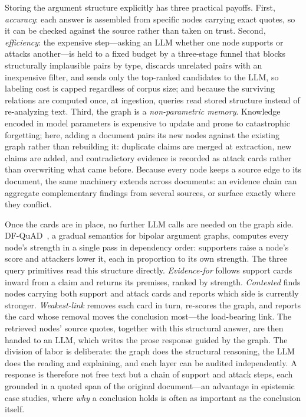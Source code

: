 \documentclass{article}
\begin{document}
Storing the argument structure explicitly has three practical payoffs. First,
\emph{accuracy}: each answer is assembled from specific nodes carrying exact
quotes, so it can be checked against the source rather than taken on trust.
Second, \emph{efficiency}: the expensive step---asking an LLM whether one node
supports or attacks another---is held to a fixed budget by a three-stage funnel
that blocks structurally implausible pairs by type, discards unrelated pairs
with an inexpensive filter, and sends only the top-ranked candidates to the
LLM, so labeling cost is capped regardless of corpus size; and because the
surviving relations are computed once, at ingestion, queries read stored
structure instead of re-analyzing text. Third, the graph is a
\emph{non-parametric memory}. Knowledge encoded in model parameters is
expensive to update and prone to catastrophic forgetting; here, adding a
document pairs its new nodes against the existing graph rather than rebuilding
it: duplicate claims are merged at extraction, new claims are added, and
contradictory evidence is recorded as attack cards rather than overwriting
what came before. Because every node keeps a source edge to its document, the
same machinery extends across documents: an evidence chain can aggregate
complementary findings from several sources, or surface exactly where they
conflict.

Once the cards are in place, no further LLM calls are needed on the graph side.
DF-QuAD~\cite{rago2016dfquad}, a gradual semantics for bipolar argument graphs, computes every
node's strength in a single pass in dependency order: supporters raise a
node's score and attackers lower it, each in proportion to its own strength.
The three query primitives read this structure directly. \emph{Evidence-for}
follows support cards inward from a claim and returns its premises, ranked by
strength. \emph{Contested} finds nodes carrying both support and attack cards
and reports which side is currently stronger. \emph{Weakest-link} removes each
card in turn, re-scores the graph, and reports the card whose removal moves
the conclusion most---the load-bearing link. The retrieved nodes' source
quotes, together with this structural answer, are then handed to an LLM, which
writes the prose response guided by the graph. The division of labor is
deliberate: the graph does the structural reasoning, the LLM does the reading
and explaining, and each layer can be audited independently. A response is
therefore not free text but a chain of support and attack steps, each grounded
in a quoted span of the original document---an advantage in epistemic case
studies, where \emph{why} a conclusion holds is often as important as the
conclusion itself.
\end{document}
